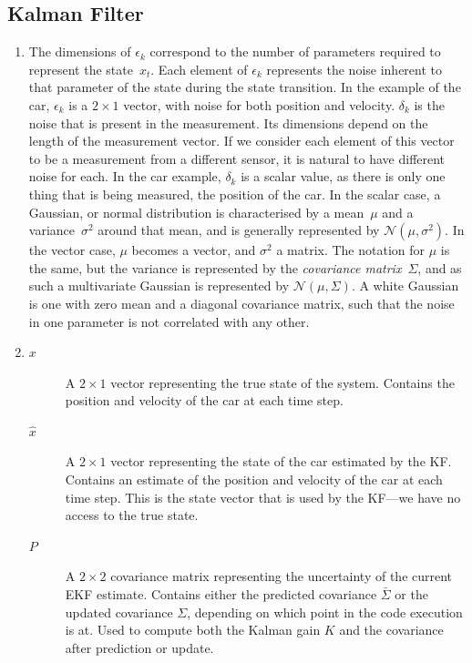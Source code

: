 \documentclass[a4paper,12pt]{article}
\begin{document}
\subsection{Kalman Filter}
\begin{enumerate}
\item The dimensions of $\epsilon_k$ correspond to the number of parameters
  required to represent the state~$x_t$. Each element of $\epsilon_k$ represents
  the noise inherent to that parameter of the state during the state
  transition. In the example of the car, $\epsilon_k$ is a $2\times 1$ vector,
  with noise for both position and velocity. $\delta_k$ is the noise that is
  present in the measurement. Its dimensions depend on the length of the
  measurement vector. If we consider each element of this vector to be a
  measurement from a different sensor, it is natural to have different noise for
  each. In the car example, $\delta_k$ is a scalar value, as there is only one
  thing that is being measured, the position of the car. In the scalar case, a
  Gaussian, or normal distribution is characterised by a mean~$\mu$ and a
  variance~$\sigma^2$ around that mean, and is generally represented by
  $\mathcal{N}(\mu,\sigma^2)$. In the vector case, $\mu$ becomes a vector, and
  $\sigma^2$ a matrix. The notation for $\mu$ is the same, but the variance is
  represented by the \emph{covariance matrix}~$\Sigma$, and as such a
  multivariate Gaussian is represented by $\mathcal{N}(\mu,\Sigma)$. A white
  Gaussian is one with zero mean and a diagonal covariance matrix, such that the
  noise in one parameter is not correlated with any other.
\item 
  \begin{description}
  \item[$x$] A $2\times 1$ vector representing the true state of the
    system. Contains the position and velocity of the car at each time step.
  \item[$\hat{x}$] A $2\times 1$ vector representing the state of the car
    estimated by the KF. Contains an estimate of the position and velocity of
    the car at each time step. This is the state vector that is used by the
    KF---we have no access to the true state.
  \item[$P$] A $2\times 2$ covariance matrix representing the uncertainty of the
    current EKF estimate. Contains either the predicted covariance
    $\bar{\Sigma}$ or the updated covariance $\Sigma$, depending on which point
    in the code execution is at. Used to compute both the Kalman gain $K$ and
    the covariance after prediction or update.

\end{description}
\end{enumerate}
\end{document}
